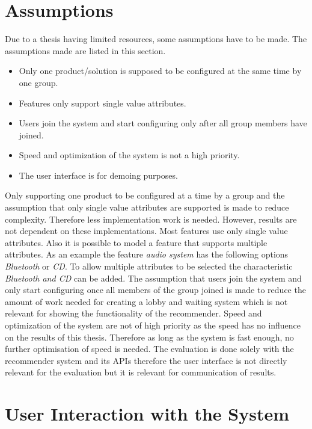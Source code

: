 \section{Assumptions}
\label{sec:Concept:Assumptions}

Due to a thesis having limited resources, some assumptions have to be made. The assumptions made are listed in this section.

\begin{itemize}
    \item Only one product/solution is supposed to be configured at the same time by one group.
    \item Features only support single value attributes.
    \item Users join the system and start configuring only after all group members have joined.
    \item Speed and optimization of the system is not a high priority.
    \item The user interface is for demoing purposes.
\end{itemize}

Only supporting one product to be configured at a time by a group and the assumption that only single value attributes are supported is made to reduce complexity. Therefore less implementation work is needed. However, results are not dependent on these implementations. Most features use only single value attributes. Also it is possible to model a feature that supports multiple attributes. As an example the feature \emph{audio system} has the following options \emph{Bluetooth} or \emph{CD}. To allow multiple attributes to be selected the characteristic \emph{Bluetooth and CD} can be added.
The assumption that users join the system and only start configuring once all members of the group joined is made to reduce the amount of work needed for creating a lobby and waiting system which is not relevant for showing the functionality of the recommender. Speed and optimization of the system are not of high priority as the speed has no influence on the results of this thesis. Therefore as long as the system is fast enough, no further optimisation of speed is needed.
The evaluation is done solely with the recommender system and its APIs therefore the user interface is not directly relevant for the evaluation but it is relevant for communication of results.

\section{User Interaction with the System}
\label{sec:Concept:UserSystemInteraction}

